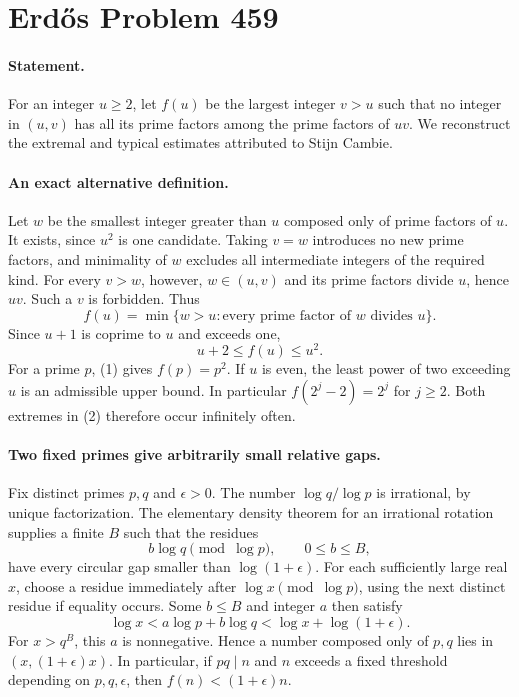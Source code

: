 \section*{Erd\H{o}s Problem 459}

\paragraph{Statement.}
For an integer \(u\geq2\), let \(f(u)\) be the largest integer \(v>u\)
such that no integer in \((u,v)\) has all its prime factors among the
prime factors of \(uv\). We reconstruct the extremal and typical
estimates attributed to Stijn Cambie.

\paragraph{An exact alternative definition.}
Let \(w\) be the smallest integer greater than \(u\) composed only of
prime factors of \(u\). It exists, since \(u^2\) is one candidate.
Taking \(v=w\) introduces no new prime factors, and minimality of \(w\)
excludes all intermediate integers of the required kind.
For every \(v>w\), however, \(w\in(u,v)\) and its prime factors divide
\(u\), hence \(uv\). Such a \(v\) is forbidden. Thus
\[
 f(u)=\min\{w>u:\text{every prime factor of }w\text{ divides }u\}.
 \tag{1}
\]
Since \(u+1\) is coprime to \(u\) and exceeds one,
\[
 u+2\leq f(u)\leq u^2.
 \tag{2}
\]
For a prime \(p\), (1) gives \(f(p)=p^2\). If \(u\) is even,
the least power of two exceeding \(u\) is an admissible upper bound.
In particular \(f(2^j-2)=2^j\) for \(j\geq2\).
Both extremes in (2) therefore occur infinitely often.

\paragraph{Two fixed primes give arbitrarily small relative gaps.}
Fix distinct primes \(p,q\) and \(\epsilon>0\).
The number \(\log q/\log p\) is irrational, by unique factorization.
The elementary density theorem for an irrational rotation supplies a
finite \(B\) such that the residues
\[
 b\log q\pmod{\log p},\qquad 0\leq b\leq B,
\]
have every circular gap smaller than \(\log(1+\epsilon)\).
For each sufficiently large real \(x\), choose a residue immediately
after \(\log x\pmod{\log p}\), using the next distinct residue if
equality occurs. Some \(b\leq B\) and integer \(a\) then satisfy
\[
 \log x<a\log p+b\log q<\log x+\log(1+\epsilon).
\]
For \(x>q^B\), this \(a\) is nonnegative. Hence a number composed
only of \(p,q\) lies in \((x,(1+\epsilon)x)\).
In particular, if \(pq\mid n\) and \(n\) exceeds a fixed threshold
depending on \(p,q,\epsilon\), then \(f(n)<(1+\epsilon)n\).

